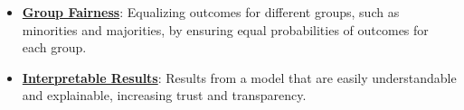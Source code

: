 \documentclass{article}%
\begin{document}
\begin{itemize}[leftmargin=*]
\item \href{https://purdue.brightspace.com/d2l/common/assets/pdfjs-d2l-dist/1.0.14-legacy/web/viewer.html?file=\%2Fcontent\%2Fenforced\%2F1095467-wl.202510.CS.24300.001\%2F16L2-ethics.pdf\%3Fou\%3D1095467\&lang=en-us\&container=d2l-fileviewer-rendered-pdf\&fullscreen=d2l-fileviewer-rendered-pdf-dialog\&height=667#page=26}{\textbf{Group Fairness}}: Equalizing outcomes for different groups, such as minorities and majorities, by ensuring equal probabilities of outcomes for each group.%
\item \href{https://purdue.brightspace.com/d2l/common/assets/pdfjs-d2l-dist/1.0.14-legacy/web/viewer.html?file=\%2Fcontent\%2Fenforced\%2F1095467-wl.202510.CS.24300.001\%2F16L2-ethics.pdf\%3Fou\%3D1095467\&lang=en-us\&container=d2l-fileviewer-rendered-pdf\&fullscreen=d2l-fileviewer-rendered-pdf-dialog\&height=667#page=28}{\textbf{Interpretable Results}}: Results from a model that are easily understandable and explainable, increasing trust and transparency.%
\end{itemize}

%
\end{document}
